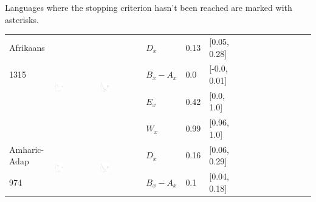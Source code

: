 \documentclass[11pt,letterpaper]{article}
\begin{document}
Languages where the stopping criterion hasn't been reached are marked with asterisks.

\begin{longtable}{lllllllllllllll}
Afrikaans  &  \multirow{4}{*}{\includegraphics[width=0.25\textwidth]{figures/Afrikaans-entropy-memory.pdf}}  &  \multirow{4}{*}{\includegraphics[width=0.25\textwidth]{figures/Afrikaans-listener-surprisal-memory.pdf}}  &  $D_x$  &  0.13  &  [0.05, 0.28]  \\ 
1315  &    &    &  $B_x-A_x$  &  0.0  &  [-0.0, 0.01]  \\ 
  &    &    &  $E_x$  &  0.42  &  [0.0, 1.0]  \\ 
  &    &    &  $W_x$  &  0.99  &  [0.96, 1.0]  \\ [10.25ex] \hline
Amharic-Adap  &  \multirow{4}{*}{\includegraphics[width=0.25\textwidth]{figures/Amharic-Adap-entropy-memory.pdf}}  &  \multirow{4}{*}{\includegraphics[width=0.25\textwidth]{figures/Amharic-Adap-listener-surprisal-memory.pdf}}  &  $D_x$  &  0.16  &  [0.06, 0.29]  \\ 
974  &    &    &  $B_x-A_x$  &  0.1  &  [0.04, 0.18]  \\ 

\end{longtable}
\end{document}

